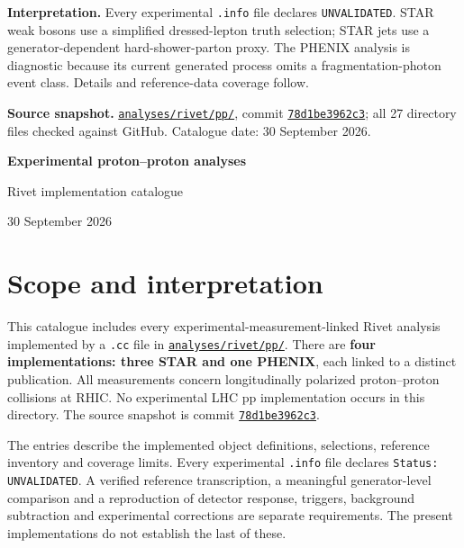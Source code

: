 \documentclass[11pt,a4paper]{article}
\begin{document}
\begin{landscape}
\textbf{Interpretation.} Every experimental \texttt{.info} file declares
\texttt{UNVALIDATED}. STAR weak bosons use a simplified dressed-lepton truth
selection; STAR jets use a generator-dependent hard-shower-parton proxy.
The PHENIX analysis is diagnostic because its current generated process omits
a fragmentation-photon event class. Details and reference-data coverage follow.

\textbf{Source snapshot.}
\href{https://github.com/apapaefs/HerwigPolarizedPheno/tree/78d1be3962c3e058409634af28dc9cd52dc9b77d/analyses/rivet/pp}{\texttt{analyses/rivet/pp/}},
commit \href{https://github.com/apapaefs/HerwigPolarizedPheno/commit/78d1be3962c3e058409634af28dc9cd52dc9b77d}{\texttt{78d1be3962c3}};
all 27 directory files checked against GitHub. Catalogue date: 30 September 2026.
\endgroup
\end{landscape}
\clearpage

\begin{center}
{\LARGE\bfseries Experimental proton--proton analyses\par}
{\large Rivet implementation catalogue\par}
30 September 2026
\end{center}

\section{Scope and interpretation}
This catalogue includes every experimental-measurement-linked Rivet analysis
implemented by a \texttt{.cc} file in
\href{https://github.com/apapaefs/HerwigPolarizedPheno/tree/78d1be3962c3e058409634af28dc9cd52dc9b77d/analyses/rivet/pp}{\texttt{analyses/rivet/pp/}}.
There are \textbf{four implementations: three STAR and one PHENIX}, each linked
to a distinct publication. All measurements concern longitudinally polarized
proton--proton collisions at RHIC. No experimental LHC pp implementation occurs
in this directory. The source snapshot is commit
\href{https://github.com/apapaefs/HerwigPolarizedPheno/commit/78d1be3962c3e058409634af28dc9cd52dc9b77d}{\texttt{78d1be3962c3}}.

The entries describe the implemented object definitions, selections, reference
inventory and coverage limits. Every experimental \texttt{.info} file declares
\texttt{Status: UNVALIDATED}. A verified reference transcription, a meaningful
generator-level comparison and a reproduction of detector response, triggers,
background subtraction and experimental corrections are separate requirements.
The present implementations do not establish the last of these.
\end{document}
